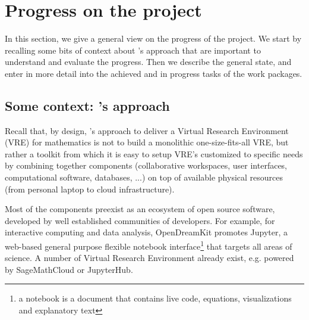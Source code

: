 \documentclass{deliverablereport}
\author{Nicolas M. Thiéry, Benoît Pilorget, et al.}
\begin{document}
\enlargethispage{4ex}
\maketitle
\githubissuedescription
\tableofcontents\newpage






\section{Progress on the project}

In this section, we give a general view on the progress of the
project. We start by recalling some bits of context about \ODK's
approach that are important to understand and evaluate the
progress. Then we describe the general state, and enter in more detail
into the achieved and in progress tasks of the work packages.

\subsection{Some context: \ODK's approach}
Recall that, by design, \ODK's approach to deliver a Virtual Research
Environment (VRE) for mathematics is not to build a monolithic
one-size-fits-all VRE, but rather a toolkit from which it is easy to
setup VRE's customized to specific needs by combining together
components (collaborative workspaces, user interfaces, computational
software, databases, ...) on top of available physical resources (from
personal laptop to cloud infrastructure).

Most of the components preexist as an ecosystem of open source
software, developed by well established communities of developers. For
example, for interactive computing and data analysis, OpenDreamKit
promotes Jupyter, a web-based general purpose flexible notebook
interface\footnote{a notebook is a document that contains live code,
  equations, visualizations and explanatory text} that targets all
areas of science. A number of Virtual Research Environment already
exist, e.g. powered by SageMathCloud or JupyterHub.
\end{document}

